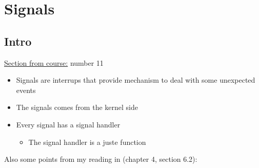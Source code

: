 \documentclass[12pt,a4paper]{book}
\begin{document}

\chapter{Signals}

\section{Intro}

\underline{Section from course:} number 11

\begin{itemize}

\item Signals are interrups that provide mechanism to deal with some unexpected events

\item The signals comes from the kernel side

\item Every signal has a signal handler

	\begin{itemize}
	\item The signal handler is a juste function 
	\end{itemize}

\end{itemize}


Also some points from my reading in \cite{book_opearting_system_concepts} (chapter 4, section 6.2):
\end{document}
